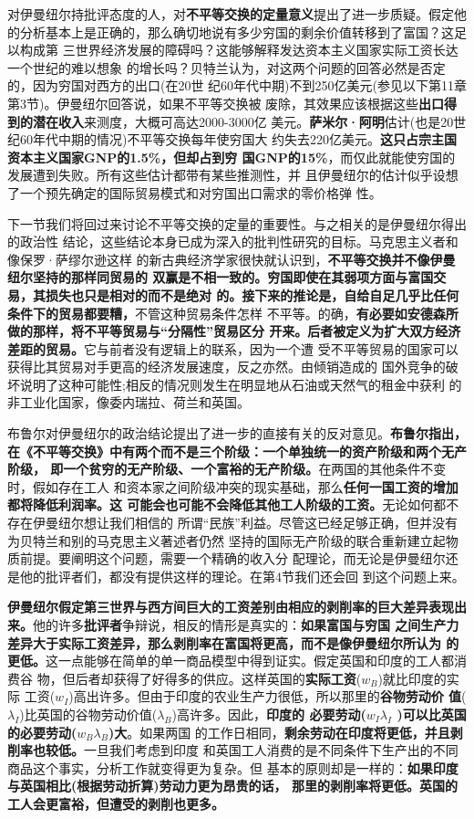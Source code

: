对伊曼纽尔持批评态度的人，对\textbf{不平等交换的定量意义}提出了进一步质疑。假定他
的分析基本上是正确的，那么确切地说有多少穷国的剩余价值转移到了富国？这足以构成第
三世界经济发展的障碍吗？这能够解释发达资本主义国家实际工资长达一个世纪的难以想象
的增长吗？贝特兰认为，对这两个问题的回答必然是否定的，因为穷国对西方的出口(在20世
纪60年代中期)不到250亿美元(参见以下第11章第3节)。伊曼纽尔回答说，如果不平等交换被
废除，其效果应该根据这些\textbf{出口得到的潜在收入}来测度，大概可高达2000-3000亿
美元。\textbf{萨米尔·阿明}估计(也是20世纪60年代中期的情况)不平等交换每年使穷国大
约失去220亿美元。\textbf{这只占宗主国资本主义国家GNP的1.5\%，但却占到穷
  国GNP的15\%}，而仅此就能使穷国的发展遭到失败。所有这些估计都带有某些推测性，并
且伊曼纽尔的估计似乎设想了一个预先确定的国际贸易模式和对穷国出口需求的零价格弹
性。

下一节我们将回过来讨论不平等交换的定量的重要性。与之相关的是伊曼纽尔得出的政治性
结论，这些结论本身已成为深入的批判性研究的目标。马克思主义者和像保罗·萨缪尔逊这样
的新古典经济学家很快就认识到，\textbf{不平等交换并不像伊曼纽尔坚持的那样同贸易的
  双赢是不相一致的。穷国即使在其弱项方面与富国交易，其损失也只是相对的而不是绝对
  的。接下来的推论是，自给自足几乎比任何条件下的贸易都要糟，}不管这种贸易条件怎样
不平等。的确，\textbf{有必要如安德森所做的那样，将不平等贸易与“分隔性”贸易区分
  开来。后者被定义为扩大双方经济差距的贸易。}它与前者没有逻辑上的联系，因为一个遭
受不平等贸易的国家可以获得比其贸易对手更高的经济发展速度，反之亦然。由倾销造成的
国外竞争的破坏说明了这种可能性;相反的情况则发生在明显地从石油或天然气的租金中获利
的非工业化国家，像委内瑞拉、荷兰和英国。

布鲁尔对伊曼纽尔的政治结论提出了进一步的直接有关的反对意见。\textbf{布鲁尔指出，
  在《不平等交换》中有两个而不是三个阶级：一个单独统一的资产阶级和两个无产阶级，
  即一个贫穷的无产阶级、一个富裕的无产阶级。}在两国的其他条件不变时，假如存在工人
和资本家之间阶级冲突的现实基础，那么\textbf{任何一国工资的增加都将降低利润率。这
  可能会也可能不会降低其他工人阶级的工资。}无论如何都不存在伊曼纽尔想让我们相信的
所谓“民族”利益。尽管这已经足够正确，但并没有为贝特兰和别的马克思主义著述者仍然
坚持的国际无产阶级的联合重新建立起物质前提。要阐明这个问题，需要一个精确的收入分
配理论，而无论是伊曼纽尔还是他的批评者们，都没有提供这样的理论。在第4节我们还会回
到这个问题上来。

\textbf{伊曼纽尔假定第三世界与西方间巨大的工资差别由相应的剥削率的巨大差异表现出
  来。}他的许多\textbf{批评者}争辩说，相反的情形是真实的：\textbf{如果富国与穷国
  之间生产力差异大于实际工资差异，那么剥削率在富国将更高，而不是像伊曼纽尔所认为
  的更低。}这一点能够在简单的单一商品模型中得到证实。假定英国和印度的工人都消费谷
物，但后者却获得了好得多的供应。这样英国的\textbf{实际工资}($w_B$)就比印度的实际
工资($w_I$)高出许多。但由于印度的农业生产力很低，所以那里的\textbf{谷物劳动价
  值}($\lambda _I$)比英国的谷物劳动价值($\lambda _B$)高许多。因此，\textbf{印度的
  必要劳动($w_I \lambda _I$ )可以比英国的必要劳动($w_B \lambda _B$)大}。如果两国
的工作日相同，\textbf{剩余劳动在印度将更低，并且剥削率也较低。}一旦我们考虑到印度
和英国工人消费的是不同条件下生产出的不同商品这个事实，分析工作就变得更为复杂。但
基本的原则却是一样的：\textbf{如果印度与英国相比(根据劳动折算)劳动力更为昂贵的话，
  那里的剥削率将更低。英国的工人会更富裕，但遭受的剥削也更多。}

